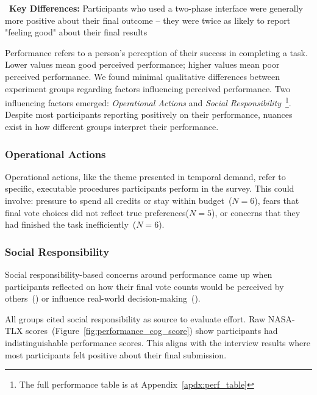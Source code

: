 \begin{tldrbox}
   \faKey~\textbf{Key Differences:} Participants who used a two-phase interface were generally more positive about their final outcome -- they were twice as likely to report "feeling good" about their final results
\end{tldrbox}

Performance refers to a person's perception of their success in completing a task. Lower values mean good perceived performance; higher values mean poor perceived performance. We found minimal qualitative differences between experiment groups regarding factors influencing perceived performance. Two influencing factors emerged: \textit{Operational Actions} and \textit{Social Responsibility}~\footnote{The full performance table is at Appendix~\ref{apdx:perf_table}}. Despite most participants reporting positively on their performance, nuances exist in how different groups interpret their performance.

\subsubsection{Operational Actions}
Operational actions, like the theme presented in temporal demand, refer to specific, executable procedures participants perform in the survey. This could involve: pressure to spend all credits or stay within budget~($N=6$), fears that final vote choices did not reflect true preferences($N=5$), or concerns that they had finished the task inefficiently~($N=6$).

\subsubsection{Social Responsibility}
Social responsibility-based concerns around performance came up when participants reflected on how their final vote counts would be perceived by others~() or influence real-world decision-making~().

All groups cited social responsibility as source to evaluate effort. Raw NASA-TLX scores~(Figure~\ref{fig:performance_cog_score}) show participants had indistinguishable performance scores. This aligns with the interview results where most participants felt positive about their final submission. 

